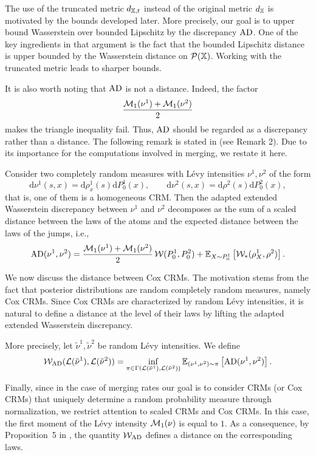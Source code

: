 The use of the truncated metric $d_{\mathbb{X},t}$ instead of the original metric $d_{\mathbb{X}}$ is motivated by the bounds developed later. More precisely, our goal is to upper bound Wasserstein over bounded Lipschitz by the discrepancy $\mathrm{AD}$. One of the key ingredients in that argument is the fact that the bounded Lipschitz distance is upper bounded by the Wasserstein distance on $\mathcal{P}(\mathbb{X})$. Working with the truncated metric leads to sharper bounds.

It is also worth noting that $\mathrm{AD}$ is not a distance. Indeed, the factor
\[
\frac{\mathcal{M}_1(\nu^1)+\mathcal{M}_1(\nu^2)}{2}
\]
makes the triangle inequality fail. Thus, $\mathrm{AD}$ should be regarded as a discrepancy rather than a distance.
The following remark is stated in \cite{catalano2026merging} (see Remark 2). Due to its importance for the computations involved in merging, we restate it here.

\begin{remark}\label{remark:adapted_extwas_homogeneous_crms}
Consider two completely random measures with L\'evy intensities $\nu^1, \nu^2$ of the form
\[
\mathrm{d}\nu^1(s,x) = \mathrm{d}\rho_x^1(s)\mathrm{d}P_0^1(x),
\qquad
\mathrm{d}\nu^2(s,x) = \mathrm{d}\rho^2(s)\mathrm{d}P_0^2(x),
\]
that is, one of them is a homogeneous CRM. Then the adapted extended Wasserstein discrepancy between $\nu^1$ and $\nu^2$ decomposes as the sum of a scaled distance between the laws of the atoms and the expected distance between the laws of the jumps, i.e.,
\[
\mathrm{AD}(\nu^1, \nu^2)
=
\frac{\mathcal{M}_1(\nu^1)+\mathcal{M}_1(\nu^2)}{2}\, \mathcal{W}(P_0^1, P_0^2)
+
\mathbb{E}_{X \sim P_0^1}\left[ \mathcal{W}_*(\rho_X^1,\rho^2)\right].
\]
\end{remark}

We now discuss the distance between Cox CRMs. The motivation stems from the fact that posterior distributions are random completely random measures, namely Cox CRMs. Since Cox CRMs are characterized by random L\'evy intensities, it is natural to define a distance at the level of their laws by lifting the adapted extended Wasserstein discrepancy.

More precisely, let $\tilde{\nu}^1, \tilde{\nu}^2$ be random L\'evy intensities. We define
\[
\mathcal{W}_{\mathrm{AD}}(\mathcal{L}(\tilde{\nu}^1), \mathcal{L}(\tilde{\nu}^2)) = \inf_{\pi \in \Gamma(\mathcal{L}(\tilde{\nu}^1), \mathcal{L}(\tilde{\nu}^2))} \mathbb{E}_{(\nu^1,\nu^2)\sim \pi}\left[\mathrm{AD}(\nu^1,\nu^2)\right].
\]

Finally, since in the case of merging rates our goal is to consider CRMs (or Cox CRMs) that uniquely determine a random probability measure through normalization, we restrict attention to scaled CRMs and Cox CRMs. In this case, the first moment of the L\'evy intensity $\mathcal{M}_1(\nu)$ is equal to $1$. As a consequence, by Proposition~5 in \cite{catalano2026merging}, the quantity $\mathcal{W}_{\mathrm{AD}}$ defines a distance on the corresponding laws.


